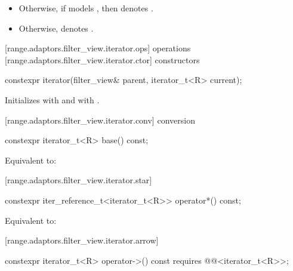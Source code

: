 \begin{addedblock}
\begin{itemize}
\item Otherwise, if   models ,
then  denotes .

\item Otherwise,  denotes .
\end{itemize}

[range.adaptors.filter_view.iterator.ops]{ operations}
[range.adaptors.filter_view.iterator.ctor]{ constructors}

%
\begin{itemdecl}
constexpr iterator(filter_view& parent, iterator_t<R> current);
\end{itemdecl}

\begin{itemdescr}
\pnum
\effects Initializes  with  and
 with .
\end{itemdescr}

[range.adaptors.filter_view.iterator.conv]{ conversion}

%
\begin{itemdecl}
constexpr iterator_t<R> base() const;
\end{itemdecl}

\begin{itemdescr}
\pnum
\effects Equivalent to: 
\end{itemdescr}

[range.adaptors.filter_view.iterator.star]{}

%
\begin{itemdecl}
constexpr iter_reference_t<iterator_t<R>> operator*() const;
\end{itemdecl}

\begin{itemdescr}
\pnum
\effects Equivalent to: 
\end{itemdescr}

[range.adaptors.filter_view.iterator.arrow]{}

%
\begin{itemdecl}
constexpr iterator_t<R> operator->() const
  requires @@<iterator_t<R>>;
\end{itemdecl}


\end{addedblock}
